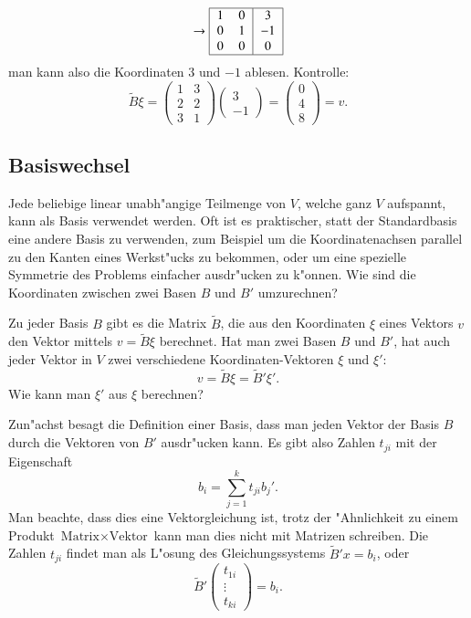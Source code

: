 \begin{beispiel}
\[\rightarrow
\begin{tabular}{|>{$}c<{$}>{$}c<{$}|>{$}c<{$}|}
\hline
1&0&3\\
0&1&-1\\
0&0&0\\
\hline
\end{tabular}
\]
man kann also die Koordinaten $3$ und $-1$ ablesen.
Kontrolle:
\[
\tilde B\xi
=
\begin{pmatrix}
1&3\\
2&2\\
3&1\end{pmatrix}
\begin{pmatrix}3\\-1\end{pmatrix}
=\begin{pmatrix}
0\\4\\8
\end{pmatrix}
=v.
\]
\end{beispiel}

\subsection{Basiswechsel}
Jede beliebige linear unabh"angige Teilmenge von $V$, welche ganz $V$
aufspannt, kann als Basis verwendet werden. Oft ist es praktischer,
statt der Standardbasis eine andere Basis zu verwenden, zum Beispiel
um die Koordinatenachsen parallel zu den Kanten eines Werkst"ucks zu
bekommen, oder um eine spezielle Symmetrie des Problems einfacher
ausdr"ucken zu k"onnen. Wie sind die Koordinaten zwischen zwei Basen
$B$ und $B'$ umzurechnen?

Zu jeder Basis $B$ gibt es die Matrix $\tilde B$, die aus den
Koordinaten $\xi$ eines Vektors $v$ den Vektor mittels $v=\tilde B\xi$
berechnet. Hat man zwei Basen $B$ und $B'$, hat auch jeder Vektor
in $V$ zwei verschiedene Koordinaten-Vektoren $\xi$ und $\xi'$:
\[
v=\tilde B\xi =\tilde B'\xi'.
\]
Wie kann man $\xi'$ aus $\xi$ berechnen?

Zun"achst besagt die Definition einer Basis, dass man 
jeden Vektor der Basis $B$ durch die Vektoren von $B'$
ausdr"ucken kann. Es gibt also Zahlen $t_{ji}$ mit
der Eigenschaft
\[
b_i=\sum_{j=1}^kt_{ji}b_j'.
\]
Man beachte, dass dies eine Vektorgleichung ist, trotz der "Ahnlichkeit
zu einem Produkt $\text{Matrix}\times\text{Vektor}$ kann man dies
nicht mit Matrizen schreiben. Die Zahlen $t_{ji}$ findet man
als L"osung des Gleichungssystems $\tilde B'x=b_i$, oder
\[
\tilde B'\begin{pmatrix}t_{1i}\\\vdots\\t_{ki}\end{pmatrix}=b_i.
\]

